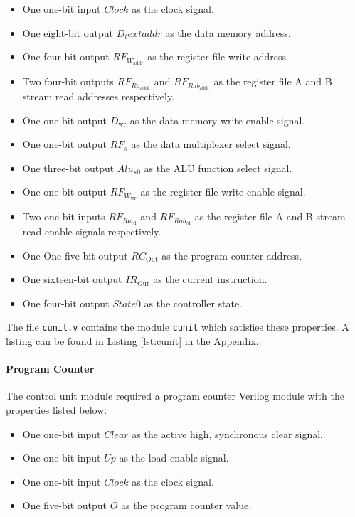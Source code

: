 \begin{itemize}
    \item One one-bit input $Clock$ as the clock signal.
    \item One eight-bit output $D_text{addr}$ as the data memory address.
    \item One four-bit output $RF_{W_\text{addr}}$ as the register file write address.
    \item Two four-bit outputs $RF_{Ra_\text{addr}}$ and $RF_{Rab_\text{addr}}$ as the register file A
    and B stream read addresses respectively.
    \item One one-bit output $D_\text{wr}$ as the data memory write enable signal.
    \item One one-bit output $RF_s$ as the data multiplexer select signal.
    \item One three-bit output $Alu_{s0}$ as the ALU function select signal.
    \item One one-bit output $RF_{W_\text{wr}}$ as the register file write enable signal.
    \item Two one-bit inputs $RF_{Ra_\text{rd}}$ and $RF_{Rab_\text{rd}}$ as the register file A and B
    stream read enable signals respectively.
    \item One One five-bit output $RC_\text{Out}$ as the program counter address.
    \item One sixteen-bit output $IR_\text{Out}$ as the current instruction.
    \item One four-bit output $State0$ as the controller state. 
\end{itemize}

The file \verb|cunit.v| contains the module \verb|cunit| which satisfies these properties.
A listing can be found in \hyperref[lst:cunit]{Listing \ref*{lst:cunit}} in the \hyperref[sec:appendix]{Appendix}.

\paragraph{Program Counter} \label{par:pc}

The control unit module required a program counter Verilog module with the properties listed below.

\begin{itemize}
    \item One one-bit input $Clear$ as the active high, synchronous clear signal.
    \item One one-bit input $Up$ as the load enable signal.
    \item One one-bit input $Clock$ as the clock signal.
    \item One five-bit output $O$ as the program counter value.
\end{itemize}

